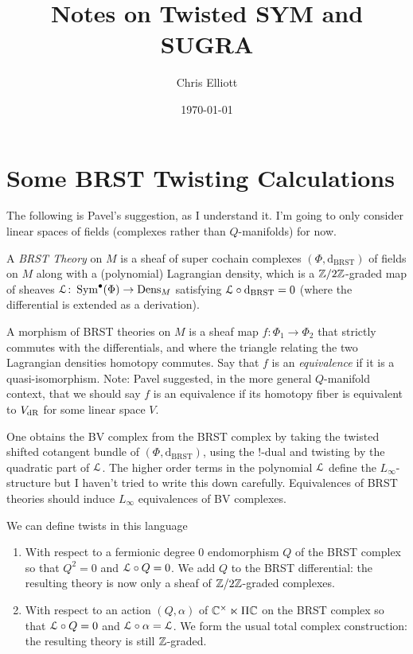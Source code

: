\documentclass[10pt, oneside]{article}
\title{Notes on Twisted SYM and SUGRA}
\author{Chris Elliott}
\date{\today}
\newcommand{\dBRST}{\mathrm d_{\mathrm{BRST}}}
\begin{document}
\section{Some BRST Twisting Calculations}
 
The following is Pavel's suggestion, as I understand it.  I'm going to only consider linear spaces of fields (complexes rather than $Q$-manifolds) for now.

\begin{definition}
A \emph{BRST Theory} on $M$ is a sheaf of super cochain complexes $(\Phi, \dBRST)$ of fields on $M$ along with a (polynomial) Lagrangian density, which is a $\mathbb{Z}/2\mathbb{Z}$-graded map of sheaves $\mathcal{L} \colon \operatorname{Sym}^\bullet(\Phi) \to \operatorname{Dens}_M$ satisfying $\LL \circ \dBRST = 0$ (where the differential is extended as a derivation).

A morphism of BRST theories on $M$ is a sheaf map $f \colon \Phi_1 \to \Phi_2$ that strictly commutes with the differentials, and where the triangle relating the two Lagrangian densities homotopy commutes.  Say that $f$ is an \emph{equivalence} if it is a quasi-isomorphism.  Note: Pavel suggested, in the more general $Q$-manifold context, that we should say $f$ is an equivalence if its homotopy fiber is equivalent to $V_{\mathrm{dR}}$ for some linear space $V$.
\end{definition}

\begin{remark}
One obtains the BV complex from the BRST complex by taking the twisted shifted cotangent bundle of $(\Phi, \dBRST)$, using the $!$-dual and twisting by the quadratic part of $\mathcal{L}$.  The higher order terms in the polynomial $\mathcal{L}$ define the $L_\infty$-structure but I haven't tried to write this down carefully.   Equivalences of BRST theories should induce $L_\infty$ equivalences of BV complexes.
\end{remark}

We can define twists in this language
\vspace{-10pt}
\begin{enumerate}
 \item With respect to a fermionic degree 0 endomorphism $Q$ of the BRST complex so that $Q^2 = 0$ and $\mathcal{L} \circ Q = 0$.  We add $Q$ to the BRST differential: the resulting theory is now only a sheaf of $\mathbb{Z}/2\mathbb{Z}$-graded complexes.
 \item With respect to an action $(Q,\alpha)$ of $\mathbb{C}^\times \ltimes \Pi \mathbb{C}$ on the BRST complex so that $\mathcal{L} \circ Q = 0$ and $\mathcal{L} \circ \alpha = \mathcal{L}$.  We form the usual total complex construction: the resulting theory is still $\mathbb{Z}$-graded.
\end{enumerate}
\vspace{-10pt}
\end{document}
